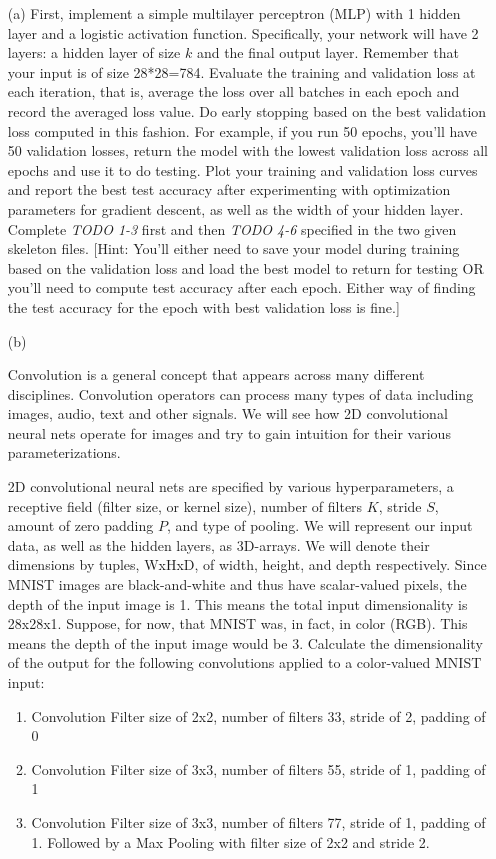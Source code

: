 \documentclass[10pt]{report}
\begin{document}
\begin{enumerate}
\begin{enumerate}

\item[(a)] First, implement a simple multilayer perceptron (MLP) with 1 hidden layer and a logistic activation function. Specifically, your network will have 2 layers: a hidden layer of size $k$ and the final output layer. Remember that your input is of size 28*28=784. Evaluate the training and validation loss at each iteration, that is, average the loss over all batches in each epoch and record the averaged loss value. Do early stopping based on the best validation loss computed in this fashion. For example, if you run 50 epochs, you'll have 50  validation losses, return the model with the lowest validation loss across all epochs and use it to do testing. Plot your training and validation loss curves and report the best test accuracy after experimenting with optimization parameters for gradient descent, as well as the width of your hidden layer. Complete \textit{TODO 1-3} first and then \textit{TODO 4-6} specified in the two given skeleton files. [Hint: You'll either need to save your model during training based on the validation loss and load the best model to return for testing OR you'll need to compute test accuracy after each epoch. Either way of finding the test accuracy for the epoch with best validation loss is fine.]

\item[(b)] 

Convolution is a general concept that appears across many different disciplines. Convolution operators can process many types of data including images, audio, text and other signals. We will see how 2D convolutional neural nets operate for images and try to gain intuition for their various parameterizations.   

2D convolutional neural nets are specified by various hyperparameters, a receptive field (filter size, or kernel size), number of filters $K$, stride $S$, amount of zero padding $P$, and type of pooling. We will represent our input data, as well as the hidden layers, as 3D-arrays. We will denote their dimensions by tuples, WxHxD, of width, height, and depth respectively. Since MNIST images are black-and-white and thus have scalar-valued pixels, the depth of the input image is 1. This means the total input dimensionality is 28x28x1. Suppose, for now, that MNIST was, in fact, in color (RGB). This means the depth of the input image would be 3. Calculate the dimensionality of the output for the following convolutions applied to a color-valued MNIST input:
\begin{enumerate}
\item Convolution Filter size of 2x2, number of filters 33, stride of 2, padding of 0
\item Convolution Filter size of 3x3, number of filters 55, stride of 1, padding of 1
\item Convolution Filter size of 3x3, number of filters 77, stride of 1, padding of 1. Followed by a Max Pooling with filter size of 2x2 and stride 2. 
\end{enumerate}


\end{enumerate}
\end{enumerate}
\end{document}
